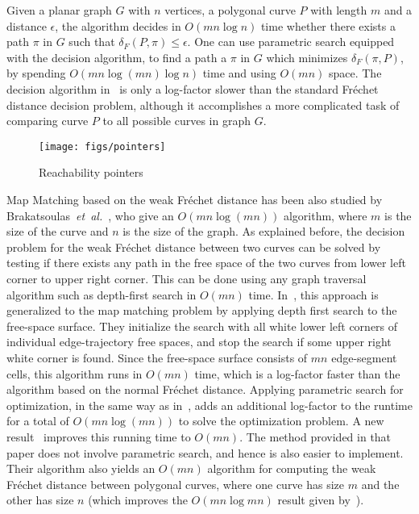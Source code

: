 \documentclass[12pt]{dalthesis}
\newcommand{\etal}{{\em et~al.\/}}
\newcommand{\Frechet}{Fr\'echet }
\newcommand{\distF}{\delta_F}
\begin{document}
Given a planar graph $G$ with $n$ vertices, 
a polygonal curve $P$ 
with length $m$ and a distance $\epsilon$, 
the algorithm decides in $O(m n\log n)$ time whether there exists a path
$\pi$ in $G$ such that  
 $\distF(P,\pi) \le \epsilon$. 
One can  use  parametric search equipped with the decision algorithm, 
to find a path a $\pi$ in $G$ which minimizes $\distF(\pi,P)$, 
by spending  $O(mn\log(mn) \log n)$ time and using $O(mn)$ space.
The decision algorithm in~\cite{AltERW03a}
is only a log-factor slower than the standard \Frechet distance decision problem, although 
it accomplishes a  more complicated task of comparing curve $P$
to all possible curves in graph $G$.


\begin{figure}[t]
	\centering
	\texttt{[image: figs/pointers]}
	\caption{Reachability pointers}
	\label{fig:pointers}
\end{figure}


Map Matching based on the weak \Frechet distance has been also studied
by Brakatsoulas~\etal~\cite{VehicleTracking}, who give an $O(mn \log (mn))$ algorithm, where $m$ is the size of the curve and $n$ is the size of the graph. 
As explained before, the decision problem for the weak \Frechet distance
between two curves can be solved by testing if there
exists any path in the free space of the two curves from
lower left corner to upper right corner. This
can be done using any graph traversal algorithm such
as depth-first search in $O(mn)$ time.
In~\cite{VehicleTracking}, this approach 
is generalized to the map matching
problem by applying depth first search to
the free-space surface. They initialize the search with all
white lower left corners of individual edge-trajectory
free spaces, and stop the search if some upper
right white corner is found. Since the free-space surface
consists of $mn$ edge-segment cells, this algorithm runs
in $O(mn)$ time, which is a log-factor faster than the
algorithm based on the normal \Frechet distance. Applying
parametric search for optimization, in the same way as
in~\cite{AltG95}, adds an additional log-factor to the runtime
for a total of $O(mn \log(mn))$ to solve the optimization
problem. A new result~\cite{fasterMM-Weak1}
improves this running time to $O(mn)$. The method provided in that 
paper does not involve parametric search, 
and hence is also easier to implement. 
 Their algorithm also yields an $O(mn)$ algorithm for computing 
 the weak \Frechet distance between polygonal curves, 
 where one curve has size $m$ and the other has size $n$ (which
improves the $O(mn \log mn)$ result given by~\cite{AltG95}).
\end{document}
